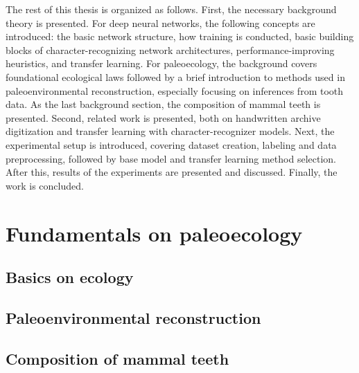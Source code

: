 \documentclass{article}
\begin{document}
The rest of this thesis is organized as follows. First, the necessary background theory is 
presented. For deep neural networks, the following concepts are introduced:
the basic network structure, how training is conducted, basic building blocks of character-recognizing network architectures, performance-improving 
heuristics, and transfer learning. For paleoecology, the background covers 
foundational ecological laws followed by a brief introduction to methods used in
paleoenvironmental reconstruction, especially focusing on inferences from tooth data.
As the last background section, the composition of mammal teeth is presented. 
Second, related work is presented, both on
handwritten archive digitization and transfer learning with character-recognizer models.
Next, the experimental setup is introduced, covering dataset creation, labeling and data 
preprocessing, followed by base model and transfer learning method selection. After this, 
results of the experiments are presented and discussed. Finally, the work is concluded.

\section{Fundamentals on paleoecology}

\subsection{Basics on ecology}

\subsection{Paleoenvironmental reconstruction}

\subsection{Composition of mammal teeth}

\end{document}
